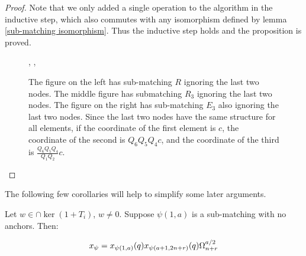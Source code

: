 \documentclass{amsart}
\begin{document}
\begin{proof}
 	Note that we only added a single operation to the algorithm in the inductive step, which also commutes with any isomorphism defined by lemma \ref{sub-matching isomorphism}. Thus the inductive step holds and the proposition is proved.
 	
 	\begin{figure}
 		\def\cbasisspacing{1mm}
 		\begin{adjustbox}{width=\textwidth}
 			, \hspace{\cbasisspacing}
 			, \hspace{\cbasisspacing}
 		\end{adjustbox}
 		
 		\caption{The figure on the left has sub-matching $R$ ignoring the last two nodes. The middle figure has submatching $R_3$ ignoring the last two nodes. The figure on the right has sub-matching $E_3$ also ignoring the last two nodes. Since the last two nodes have the same structure for all elements, if the coordinate of the first element is $c$, the coordinate of the second is $Q_6Q_5Q_4c$, and the coordinate of the third is $\frac{Q_6Q_5Q_4}{Q_1Q_2}c$.}
 		
 		\label{kernel induct characterization example}
 	\end{figure}
 	
 \end{proof}
 
 \vspace{5mm}
 The following few corollaries will help to simplify some later arguments.
 
 \begin{corollary}
 	Let $w\in\cap\ker(1+T_i)$, $w\not=0$. Suppose $\psi(1,a)$ is a sub-matching with no anchors. Then:
 	
 	$$x_\psi=x_{\psi(1,a)}(q)x_{\psi(a+1,2n+r)}(q)\Omega^{a/2}_{n+r}$$
 	
 	\label{characterization generalization}
 \end{corollary}
 
\end{document}
